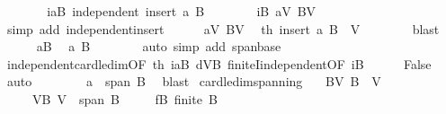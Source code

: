 \begin{isabellebody}
\ \ \ \ \isamarkupfalse%
\ \isamarkupfalse%
\ iaB{\isacharcolon}{\kern0pt}\ {\isachardoublequoteopen}independent\ {\isacharparenleft}{\kern0pt}insert\ a\ B{\isacharparenright}{\kern0pt}{\isachardoublequoteclose}\isanewline
\ \ \ \ \ \ \isamarkupfalse%
\ iB\ aV\ BV\ \isamarkupfalse%
\ {\isacharparenleft}{\kern0pt}simp\ add{\isacharcolon}{\kern0pt}\ independent{\isacharunderscore}{\kern0pt}insert{\isacharparenright}{\kern0pt}\isanewline
\ \ \ \ \isamarkupfalse%
\ aV\ BV\ \isamarkupfalse%
\ th{}{\isacharcolon}{\kern0pt}\ {\isachardoublequoteopen}insert\ a\ B\ {\isasymsubseteq}\ V{\isachardoublequoteclose}\isanewline
\ \ \ \ \ \ \isamarkupfalse%
\ blast\isanewline
\ \ \ \ \isamarkupfalse%
\ aB\ \isamarkupfalse%
\ {\isachardoublequoteopen}a\ {\isasymnotin}B{\isachardoublequoteclose}\isanewline
\ \ \ \ \ \ \isamarkupfalse%
\ {\isacharparenleft}{\kern0pt}auto\ simp\ add{\isacharcolon}{\kern0pt}\ span{\isacharunderscore}{\kern0pt}base{\isacharparenright}{\kern0pt}\isanewline
\ \ \ \ \isamarkupfalse%
\ independent{\isacharunderscore}{\kern0pt}card{\isacharunderscore}{\kern0pt}le{\isacharunderscore}{\kern0pt}dim{\isacharbrackleft}{\kern0pt}OF\ th{}\ iaB{\isacharbrackright}{\kern0pt}\ dVB\ finiteI{\isacharunderscore}{\kern0pt}independent{\isacharbrackleft}{\kern0pt}OF\ iB{\isacharbrackright}{\kern0pt}\isanewline
\ \ \ \ \isamarkupfalse%
\ False\ \isamarkupfalse%
\ auto\isanewline
\ \ \isacommand{{\isacharbraceright}{\kern0pt}}\isamarkupfalse%
\isanewline
\ \ \isamarkupfalse%
\ \isamarkupfalse%
\ {\isachardoublequoteopen}a\ {\isasymin}\ span\ B{\isachardoublequoteclose}\ \isamarkupfalse%
\ blast\isanewline
{}\isamarkupfalse%
%
\endisatagproof
{\isafoldproof}%
%
\isadelimproof
\isanewline
%
\endisadelimproof
\isanewline
{}\isamarkupfalse%
\ card{\isacharunderscore}{\kern0pt}le{\isacharunderscore}{\kern0pt}dim{\isacharunderscore}{\kern0pt}spanning{\isacharcolon}{\kern0pt}\isanewline
\ \ \ BV{\isacharcolon}{\kern0pt}\ {\isachardoublequoteopen}B\ {\isasymsubseteq}\ V{\isachardoublequoteclose}\isanewline
\ \ \ \ \ VB{\isacharcolon}{\kern0pt}\ {\isachardoublequoteopen}V\ {\isasymsubseteq}\ span\ B{\isachardoublequoteclose}\isanewline
\ \ \ \ \ fB{\isacharcolon}{\kern0pt}\ {\isachardoublequoteopen}finite\ B{\isachardoublequoteclose}\isanewline

\end{isabellebody}
